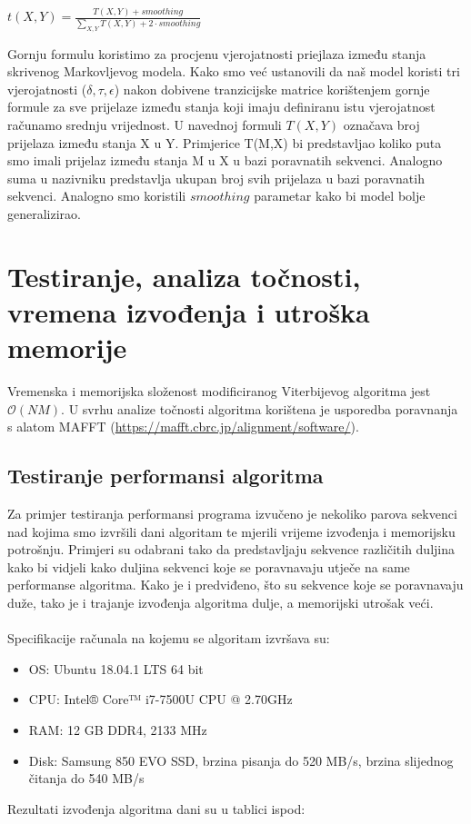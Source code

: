 \documentclass[a4paper]{article}
\begin{document}
\begin{center}
$t(X, Y) = \frac{T(X, Y) + smoothing}{\sum_{X, Y} T(X, Y)  + 2\cdot smoothing}$
\end{center}


Gornju formulu koristimo za procjenu vjerojatnosti priejlaza između stanja skrivenog Markovljevog modela. Kako smo već ustanovili da naš model koristi tri vjerojatnosti ($\delta, \tau, \epsilon$) nakon dobivene tranzicijske matrice korištenjem gornje formule za sve prijelaze između stanja koji imaju definiranu istu vjerojatnost računamo srednju vrijednost. U navednoj formuli $T(X,Y)$ označava broj prijelaza između stanja X u Y. Primjerice T(M,X) bi predstavljao koliko puta smo imali prijelaz između stanja M u X u bazi poravnatih sekvenci. Analogno suma u nazivniku predstavlja ukupan broj svih prijelaza u bazi poravnatih sekvenci. Analogno smo koristili $smoothing$ parametar kako bi model bolje generalizirao.


\section{Testiranje, analiza točnosti, vremena izvođenja i utroška memorije}
Vremenska i memorijska složenost modificiranog Viterbijevog algoritma jest $\mathcal{O}(NM)$. U svrhu analize točnosti algoritma korištena je usporedba  poravnanja s alatom MAFFT (\url{https://mafft.cbrc.jp/alignment/software/}).\\

\subsection{Testiranje performansi algoritma}
Za primjer testiranja performansi programa izvučeno je nekoliko parova sekvenci nad kojima smo izvršili dani algoritam te mjerili vrijeme izvođenja i memorijsku potrošnju. Primjeri su odabrani tako da predstavljaju sekvence različitih duljina kako bi vidjeli kako duljina sekvenci koje se poravnavaju utječe na same performanse algoritma. Kako je i predviđeno, što su sekvence koje se poravnavaju duže, tako je i trajanje izvođenja algoritma dulje, a memorijski utrošak veći.\\\\
Specifikacije računala na kojemu se algoritam izvršava su:
\begin{itemize}
  \item OS: Ubuntu 18.04.1 LTS 64 bit
  \item CPU: Intel® Core™ i7-7500U CPU @ 2.70GHz
  \item RAM: 12 GB DDR4, 2133 MHz
  \item Disk: Samsung 850 EVO SSD, brzina pisanja do 520 MB/s, brzina slijednog čitanja do 540 MB/s
\end{itemize}
Rezultati izvođenja algoritma dani su u tablici ispod:
\end{document}
